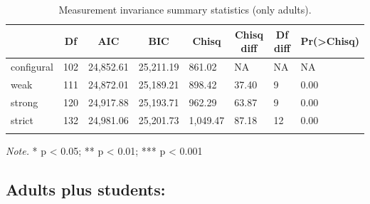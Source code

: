 \documentclass[
  english,
  man]{apa6}
\begin{document}
\begin{table}[tbp]

\begin{center}
\begin{threeparttable}

\caption{\label{tab:measinv}Measurement invariance summary statistics (only adults).}

\begin{tabular}{llllllll}
\toprule
 & \multicolumn{1}{c}{Df} & \multicolumn{1}{c}{AIC} & \multicolumn{1}{c}{BIC} & \multicolumn{1}{c}{Chisq} & \multicolumn{1}{c}{Chisq diff} & \multicolumn{1}{c}{Df diff} & \multicolumn{1}{c}{Pr(>Chisq)}\\
\midrule
configural & 102 & 24,852.61 & 25,211.19 & 861.02 & NA & NA & NA\\
weak & 111 & 24,872.01 & 25,189.21 & 898.42 & 37.40 & 9 & 0.00\\
strong & 120 & 24,917.88 & 25,193.71 & 962.29 & 63.87 & 9 & 0.00\\
strict & 132 & 24,981.06 & 25,201.73 & 1,049.47 & 87.18 & 12 & 0.00\\
\bottomrule
\addlinespace
\end{tabular}

\begin{tablenotes}[para]
\normalsize{\textit{Note.} * p < 0.05; ** p < 0.01; *** p < 0.001}
\end{tablenotes}

\end{threeparttable}
\end{center}

\end{table}

\hypertarget{adults-plus-students}{%
\subsection{Adults plus students:}\label{adults-plus-students}}
\end{document}
